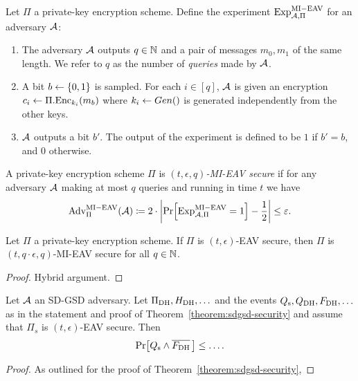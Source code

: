 \begin{definition}
	Let $\Pi$ a private-key encryption scheme. Define the experiment $\mathrm{Exp}_{\mathcal{A}, \Pi}^{\mathrm{MI-EAV}}$ for an adversary $\mathcal{A}$:
	\begin{enumerate}[1.]
		\item The adversary $\mathcal{A}$ outputs $q \in \mathbb{N}$ and a pair of messages $m_0, m_1$ of the same length. We refer to $q$ as the number of \emph{queries} made by $\mathcal{A}$.
		\item A bit $b \leftarrow \{0, 1\}$ is sampled. For each $i \in [q]$, $\mathcal{A}$ is given an encryption $c_i \leftarrow \Pi.\mathrm{Enc}_{k_i}(m_b)$ where $k_i \leftarrow Gen()$ is generated independently from the other keys.
		\item $\mathcal{A}$ outputs a bit $b'$. The output of the experiment is defined to be $1$ if $b' = b$, and $0$ otherwise.
	\end{enumerate}
\end{definition}

\begin{definition}
	A private-key encryption scheme $\Pi$ is \emph{$(t, \epsilon, q)$-MI-EAV secure} if for any adversary $\mathcal{A}$ making at most $q$ queries and running in time $t$ we have
	\begin{align*}
		\mathrm{Adv}_{\Pi}^{\mathrm{MI-EAV}}(\adv) \coloneqq 2 \cdot \abs*{\pr{\mathrm{Exp}_{\adv, \Pi}^{\mathrm{MI-EAV}} = 1} - \frac{1}{2}} \le \epsilon.
	\end{align*}
\end{definition}

\begin{lemma}
	Let $\Pi$ a private-key encryption scheme. If $\Pi$ is $(t, \epsilon)$-EAV secure, then $\Pi$ is $(t, q \cdot \epsilon, q)$-MI-EAV secure for all $q \in \mathbb{N}$.
\end{lemma}
\begin{proof}
	Hybrid argument.
\end{proof}

\begin{lemma} \label{lemma:eav-reduction}
	Let $\mathcal{A}$ an SD-GSD adversary. Let $\Pi_{\mathrm{DH}}, H_\mathrm{DH}, \ldots$ and the events $Q_\mathrm{s}, Q_\mathrm{DH}, F_\mathrm{DH}, \ldots$ as in the statement and proof of Theorem~\vref{theorem:sdgsd-security} and assume that $\Pi_s$ is $(t, \epsilon)$-EAV secure. Then
	$$
		\pr{\qs \land \overline{\fdh}\,} \le \ldots.
	$$
\end{lemma}
\begin{proof}
	As outlined for the proof of Theorem~\vref{theorem:sdgsd-security},

\end{proof}

